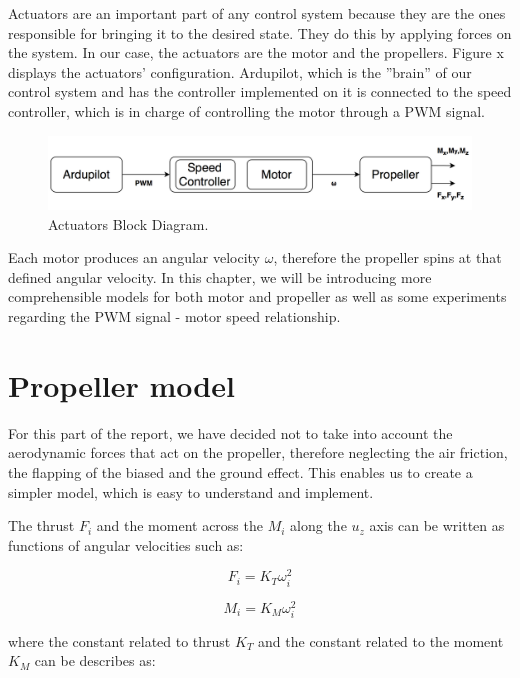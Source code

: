 Actuators are an important part of any control system because they are the ones responsible for bringing it to the desired state. They do this by applying forces on the system. In our case, the actuators are the motor and the propellers. Figure x displays the actuators' configuration. Ardupilot, which is the ''brain'' of our control system and has the controller implemented on it is connected to the speed controller, which is in charge of controlling the motor through a PWM signal. 

\begin{figure}[H]
  \centering
    \includegraphics[width=1\textwidth]{images/ablockd.png}
	\caption{Actuators Block Diagram.}
	\label{ablockd}
\end{figure}

Each motor produces an angular velocity $\omega$, therefore the propeller spins at that defined angular velocity. In this chapter, we will be introducing more comprehensible models for both motor and propeller as well as some experiments regarding the PWM signal - motor speed relationship.

\section{Propeller model}
For this part of the report, we have decided not to take into account the aerodynamic forces that act on the propeller, therefore neglecting the air friction, the flapping of the biased and the ground effect. This enables us to create a simpler model, which is easy to understand and implement.

The thrust $F_{i}$ and the moment across the $M_{i}$ along the $u_{z}$ axis can be written as functions of angular velocities such as:

\begin{equation}
	F_{i}=K_{T}\omega_{i}^{2}
\end{equation}

\begin{equation}
	M_{i}=K_{M}\omega_{i}^{2}
\end{equation}

where the constant related to thrust $K_{T}$ and the constant related to the moment $K_{M}$ can be describes as:

